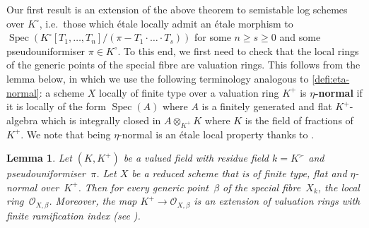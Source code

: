 \documentclass[a4paper,twoside,11pt,reqno]{amsart}
\newcommand{\cO}{{\mathcal O}}
\DeclareMathOperator{\Spec}{Spec}
\newcommand{\stacks}[2][Tag]{\cite[\href{https://stacks.math.columbia.edu/tag/#2}{#1~#2}]{StacksProject}}
\newtheorem{lem}[thm]{Lemma}
\theoremstyle{definition}
\numberwithin{equation}{subsection}
\begin{document}
Our first result is an extension of the above theorem to semistable log schemes over $K^\circ$, i.e.\ those which \'etale locally admit an \'etale morphism to $\Spec(K^\circ[T_1,\dots,T_n]/(\pi- T_1\cdot\ldots\cdot T_s))$ for some $n \geq s \geq 0$ and some pseudouniformiser $\pi\in K^\circ$. To this end, we first need to check that the local rings of the generic points of the special fibre are valuation rings. This follows from the lemma below, in which we use the following terminology analogous to \cref{defi:eta-normal}: a scheme $X$ locally of finite type over a valuation ring $K^+$ is {\bf $\eta$-normal} if it is locally of the form $\Spec(A)$ where $A$ is a finitely generated and flat $K^+$-algebra which is integrally closed in $A\otimes_{K^+} K$ where $K$ is the field of fractions of $K^+$. We note that being $\eta$-normal is an \'etale local property thanks to \stacks[Lemma]{03GG}.


\begin{lem} \label{lem:local-ring-val-ring}
    Let $(K,K^+)$ be a valued field with residue field $k = K^\succ$ and pseudouniformiser~$\pi$.
    Let $X$ be a reduced scheme that is of finite type, flat and $\eta$-normal over~$K^+$.
    Then for every generic point~$\beta$ of the special fibre~$X_k$, the local ring~$\cO_{X,\beta}$.
    Moreover, the map $K^+\to \cO_{X,\beta}$ is an extension of valuation rings with finite ramification index (see \stacks[Definition]{0ASG}). 
\end{lem}
\end{document}
